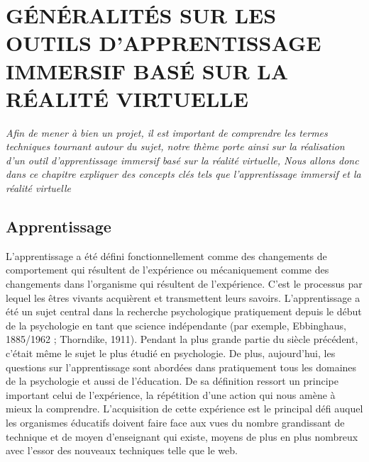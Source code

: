 


\chapter{GÉNÉRALITÉS SUR LES OUTILS D'APPRENTISSAGE IMMERSIF BASÉ SUR LA RÉALITÉ VIRTUELLE}


\textit{Afin de mener à bien un projet, il est important de comprendre les termes techniques tournant autour du sujet, notre thème porte ainsi sur la réalisation d'un outil d'apprentissage immersif basé sur la réalité virtuelle, Nous allons donc dans ce chapitre expliquer des concepts clés tels que l'apprentissage immersif et la réalité virtuelle}
\clearpage

\section{Apprentissage}

L'apprentissage a été défini fonctionnellement comme des changements de comportement qui résultent de l'expérience ou mécaniquement comme des changements dans l'organisme qui résultent de l'expérience\cite{deHouwer2013WhatIL}.
C'est le processus par lequel les êtres vivants acquièrent et transmettent leurs savoirs.
L'apprentissage a été un sujet central dans la recherche psychologique pratiquement depuis le début de la psychologie
en tant que science indépendante (par exemple, Ebbinghaus, 1885/1962 ; Thorndike, 1911).
Pendant la plus grande partie du siècle précédent, c'était même le sujet le plus étudié en psychologie.
De plus, aujourd'hui, les questions sur l'apprentissage sont abordées dans pratiquement tous les domaines de la psychologie et aussi de l'éducation\cite{deHouwer2013WhatIL}.
De sa définition ressort un principe important celui de l'expérience, la répétition d'une action qui nous amène à mieux la comprendre.
L'acquisition de cette expérience est le principal défi auquel les organismes éducatifs doivent faire face aux vues du nombre grandissant de technique et de moyen d'enseignant qui existe, moyens de plus en plus nombreux avec
l'essor des nouveaux techniques telle que le web.

